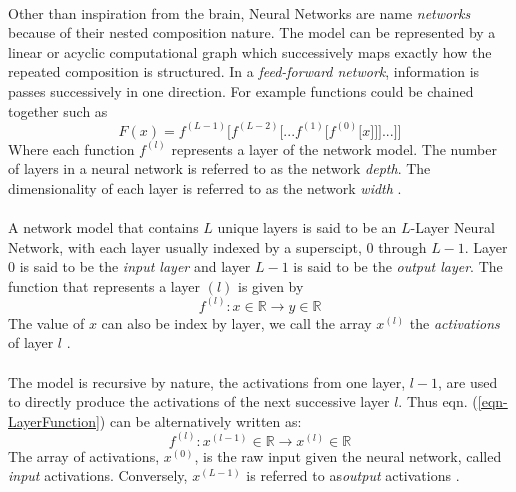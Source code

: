 \documentclass[12pt,letterpaper]{article}
\begin{document}
\paragraph*{}Other than inspiration from the brain, Neural Networks are name \textit{networks} because of their nested composition nature. The model can be represented by a linear or acyclic computational graph which successively maps exactly how the repeated composition is structured. In a \textit{feed-forward network}, information is passes successively in one direction. For example functions could be chained together such as \cite{Goodfellow}
\begin{equation}
\label{eqn-FunctionChain}
F(x) = f^{(L-1)}\big[f^{(L-2)}\big[...f^{(1)}\big[f^{(0)}\big[x]\big]\big]...\big]\big]
\end{equation}
Where each function $f^{(l)}$ represents a layer of the network model. The number of layers in a neural network is referred to as the network \textit{depth}. The dimensionality of each layer is referred to as the network \textit{width} \cite{Geron,Loy}.

\paragraph*{}A network model that contains $L$ unique layers is said to be an $L$-Layer Neural Network, with each layer usually indexed by a superscipt, $0$ through $L-1$. Layer $0$ is said to be the \textit{input layer} and layer $L-1$ is said to be the \textit{output layer}. The function that represents a layer $(l)$ is given by 
\begin{equation}
\label{eqn-LayerFunction}
f^{(l)} : x \in \mathbb{R} \rightarrow y \in \mathbb{R}
\end{equation}
The value of $x$ can also be index by layer, we call the array $x^{(l)}$ the \textit{activations} of layer $l$ \cite{Goodfellow,Loy}. 

\paragraph*{}The model is recursive by nature, the activations from one layer, $l-1$, are used to directly produce the activations of the next successive layer $l$. Thus eqn. (\ref{eqn-LayerFunction}) can be alternatively written as:
\begin{equation}
\label{eqn-altLayerFunction}
f^{(l)} : x^{(l-1)} \in \mathbb{R} \rightarrow x^{(l)} \in \mathbb{R}
\end{equation}
The array of activations, $x^{(0)}$, is the raw input given the neural network, called \textit{input} activations. Conversely, $x^{(L-1)}$ is referred to as\textit{output} activations \cite{Geron,James,Loy}.
\end{document}
